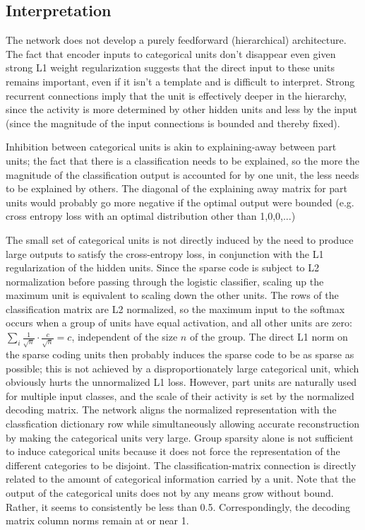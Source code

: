\documentclass{article} %
\begin{document}
\subsection{Interpretation}

The network does not develop a purely feedforward (hierarchical) architecture.  The fact that encoder inputs to categorical units don't disappear even given strong L1 weight regularization suggests that the direct input to these units remains important, even if it isn't a template and is difficult to interpret.  Strong recurrent connections imply that the unit is effectively deeper in the hierarchy, since the activity is more determined by other hidden units and less by the input (since the magnitude of the input connections is bounded and thereby fixed).

Inhibition between categorical units is akin to explaining-away between part units; the fact that there is a classification needs to be explained, so the more the magnitude of the classification output is accounted for by one unit, the less needs to be explained by others.  The diagonal of the explaining away matrix for part units would probably go more negative if the optimal output were bounded (e.g. cross entropy loss with an optimal distribution other than 1,0,0,...)


The small set of categorical units is not directly induced by the need to produce large outputs to satisfy the cross-entropy loss, in conjunction with the L1 regularization of the hidden units.  Since the sparse code is subject to L2 normalization before passing through the logistic classifier, scaling up the maximum unit is equivalent to scaling down the other units.  The rows of the classification matrix are L2 normalized, so the maximum input to the softmax occurs when a group of units have equal activation, and all other units are zero: $\sum_i \frac{1}{\sqrt{n}} \cdot \frac{c}{\sqrt{n}} = c$, independent of the size $n$ of the group.  
The direct L1 norm on the sparse coding units then probably induces the sparse code to be as sparse as possible; this is not achieved by a disproportionately large categorical unit, which obviously hurts the unnormalized L1 loss.  However, part units are naturally used for multiple input classes, and the scale of their activity is set by the normalized decoding matrix.  The network aligns the normalized representation with the classfication dictionary row while simultaneously allowing accurate reconstruction by making the categorical units very large.  Group sparsity alone is not sufficient to induce categorical units because it does not force the representation of the different categories to be disjoint.  The classification-matrix connection is directly related to the amount of categorical information carried by a unit.  Note that the output of the categorical units does not by any means grow without bound.  Rather, it seems to consistently be less than 0.5.  Correspondingly, the decoding matrix column norms remain at or near 1.
\end{document}
